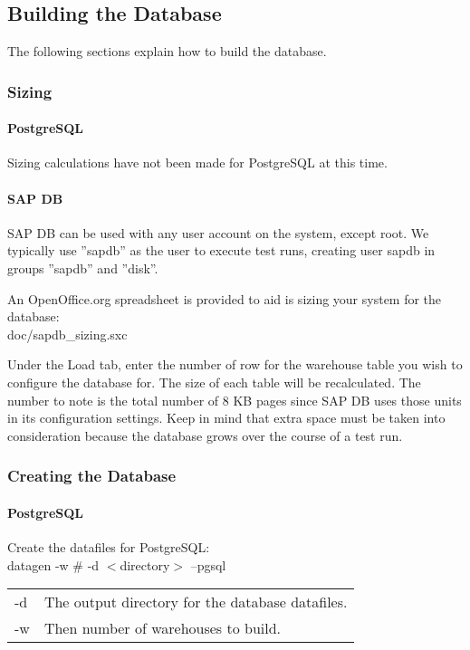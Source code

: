 \documentclass{article}
\begin{document}
\subsection{Building the Database}

The following sections explain how to build the database.

\subsubsection{Sizing}

\paragraph{PostgreSQL}

Sizing calculations have not been made for PostgreSQL at this time.

\paragraph{SAP DB}

SAP DB can be used with any user account on the system, except root.  We
typically use ''sapdb'' as the user to execute test runs, creating user sapdb
in groups ''sapdb'' and ''disk''.

\noindent
An OpenOffice.org spreadsheet is provided to aid is sizing your system for
the database: \\
\indent doc/sapdb\_sizing.sxc

\noindent
Under the Load tab, enter the number of row for the warehouse table you wish
to configure the database for.  The size of each table will be recalculated.
The number to note is the total number of 8 KB pages since SAP DB uses those
units in its configuration settings.  Keep in mind that extra space must be
taken into consideration because the database grows over the course of a test
run.

\subsubsection{Creating the Database}

\paragraph{PostgreSQL}

Create the datafiles for PostgreSQL: \\
\indent datagen -w \# -d $<$directory$>$ --pgsql \\
\begin{tabular}[c]{ll}
-d	& The output directory for the database datafiles. \\
-w	& Then number of warehouses to build. \\
\end{tabular}
\end{document}
